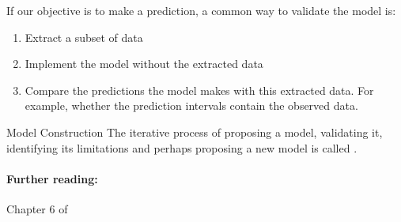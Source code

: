 If our objective is to make a prediction, a common way to validate the model is:
\begin{enumerate}
    \item Extract a subset of data
    \item Implement the model without the extracted data
    \item Compare the predictions the model makes with this extracted data.
        For example, whether the prediction intervals contain the observed data.
\end{enumerate}

\begin{definition}{Model Construction}{}
    The iterative process of proposing a model, validating it, identifying its limitations and
    perhaps proposing a new model is called .
\end{definition}


\paragraph{Further reading:} Chapter 6 of \cite{gelman_bayesian_2013}
